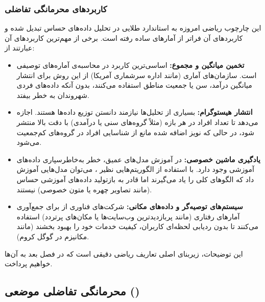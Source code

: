 \subsubsection{کاربردهای محرمانگی تفاضلی}
این چارچوب ریاضی امروزه به استاندارد طلایی در تحلیل داده‌های حساس تبدیل شده و کاربردهای آن فراتر از آمارهای ساده رفته است. برخی از مهم‌ترین کاربردهای آن عبارتند از:

\begin{itemize}
 \item \textbf{تخمین میانگین و مجموع:} 
  اساسی‌ترین کاربرد  در محاسبه‌ی آماره‌های توصیفی است. سازمان‌های آماری (مانند اداره سرشماری آمریکا) از این روش برای انتشار میانگین درآمد، سن یا جمعیت مناطق استفاده می‌کنند، بدون آنکه داده‌های فردی شهروندان به خطر بیفتد.
  
  \item \textbf{انتشار هیستوگرام:} 
  بسیاری از تحلیل‌ها نیازمند دانستن توزیع داده‌ها هستند.  اجازه می‌دهد تا تعداد افراد در هر بازه (مثلاً گروه‌های سنی یا درآمدی) با دقت بالا منتشر شود، در حالی که نویز اضافه شده مانع از شناسایی افراد در گروه‌های کم‌جمعیت می‌شود.
  
  \item \textbf{یادگیری ماشین خصوصی:} 
  در آموزش مدل‌های عمیق، خطر به‌خاطرسپاری داده‌های آموزشی وجود دارد. با استفاده از الگوریتم‌هایی نظیر ، می‌توان مدل‌هایی آموزش داد که الگوهای کلی را یاد می‌گیرند اما قادر به بازتولید داده‌های آموزشی حساس (مانند تصاویر چهره یا متون خصوصی) نیستند.
  
  \item \textbf{سیستم‌های توصیه‌گر و داده‌های مکانی:} 
  شرکت‌های فناوری از  برای جمع‌آوری آمارهای رفتاری (مانند پربازدیدترین وب‌سایت‌ها یا مکان‌های پرتردد) استفاده می‌کنند تا بدون ردیابی لحظه‌ای کاربران، کیفیت خدمات خود را بهبود بخشند (مانند مکانیزم  در گوگل کروم).
\end{itemize}

این توضیحات، زیربنای اصلی تعاریف ریاضی دقیقی است که در فصل بعد به آن‌ها خواهیم پرداخت.




\subsection{محرمانگی تفاضلی موضعی ()}
\label{sec:intro:ldp}


